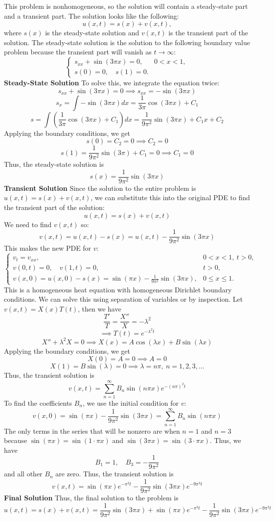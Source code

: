 \documentclass[12pt]{article}
\begin{document}
\sol
This problem is nonhomogeneous, so the solution will contain a steady-state part and a transient part. The solution looks like the following:
\[
u(x,t) = s(x) + v(x,t),
\]
where $s(x)$ is the steady-state solution and $v(x,t)$ is the transient part of the solution. The steady-state solution is the solution to the following boundary value problem because the transient part will vanish as $t \to \infty$:
\[
\begin{cases}
s_{xx} + \sin(3\pi x) = 0, & 0 < x < 1, \\
s(0) = 0,\quad s(1) = 0.
\end{cases}
\]
\textbf{Steady-State Solution}
To solve this, we integrate the equation twice:
\[
s_{xx} + \sin(3\pi x) = 0 \implies s_{xx} = -\sin(3\pi x)
\]
\[
s_x = \int -\sin(3\pi x) dx = \frac{1}{3\pi} \cos(3\pi x) + C_1
\]
\[
s = \int \left(\frac{1}{3\pi} \cos(3\pi x) + C_1\right) dx = \frac{1}{9\pi^2} \sin(3\pi x) + C_1 x + C_2
\]
Applying the boundary conditions, we get
\[
s(0) = C_2 = 0 \implies C_2 = 0
\]
\[
s(1) = \frac{1}{9\pi^2} \sin(3\pi) + C_1 = 0 \implies C_1 = 0
\]
Thus, the steady-state solution is
\[
s(x) = \frac{1}{9\pi^2} \sin(3\pi x)
\]
\textbf{Transient Solution}
Since the solution to the entire problem is $u(x,t) = s(x) + v(x,t)$, we can substitute this into the original PDE to find the transient part of the solution:
\[
u(x,t) = s(x) + v(x,t)
\]
We need to find $v(x,t)$ so:
\[
v(x,t) = u(x,t) - s(x) = u(x,t) - \frac{1}{9\pi^2} \sin(3\pi x)
\]
This makes the new PDE for $v$:
\[
\begin{cases}
v_t = v_{xx}, & 0 < x < 1,\ t > 0, \\
v(0,t) = 0,\quad v(1,t) = 0, & t > 0, \\
v(x,0) = u(x,0) - s(x) = \sin(\pi x) - \frac{1}{9\pi^2} \sin(3\pi x), & 0 \leq x \leq 1.
\end{cases}
\]
This is a homogeneous heat equation with homogeneous Dirichlet boundary conditions. We can solve this using separation of variables or by inspection. Let $v(x,t) = X(x)T(t)$, then we have
\[
\frac{T'}{T} = \frac{X''}{X} = -\lambda^2
\]
\[
\implies T(t) = e^{-\lambda^2 t}
\]
\[
X'' + \lambda^2 X = 0
\implies X(x) = A \cos(\lambda x) + B \sin(\lambda x)
\]
Applying the boundary conditions, we get
\[
X(0) = A = 0 \implies A = 0
\]
\[
X(1) = B \sin(\lambda) = 0 \implies \lambda = n\pi, \ n = 1,2,3,\dots
\]
Thus, the transient solution is
\[
v(x,t) = \sum_{n=1}^{\infty} B_n \sin(n\pi x) e^{-(n\pi)^2 t}
\]
To find the coefficients $B_n$, we use the initial condition for $v$:
\[
v(x,0) = \sin(\pi x) - \frac{1}{9\pi^2} \sin(3\pi x) = \sum_{n=1}^{\infty} B_n \sin(n\pi x)
\]
The only terms in the series that will be nonzero are when $n=1$ and $n=3$ because $\sin(\pi x) = \sin(1 \cdot \pi x)$ and $\sin(3\pi x) = \sin(3 \cdot \pi x)$. Thus, we have
\[
B_1 = 1, \quad B_3 = -\frac{1}{9\pi^2}
\]
and all other $B_n$ are zero. Thus, the transient solution is
\[
v(x,t) = \sin(\pi x) e^{-\pi^2 t} - \frac{1}{9\pi^2} \sin(3\pi x) e^{-9\pi^2 t}
\]
\textbf{Final Solution}
Thus, the final solution to the problem is
\[
\boxed{
u(x,t) = s(x) + v(x,t) = \frac{1}{9\pi^2} \sin(3\pi x) + \sin(\pi x) e^{-\pi^2 t} - \frac{1}{9\pi^2} \sin(3\pi x) e^{-9\pi^2 t}
}
\]
\end{document}
